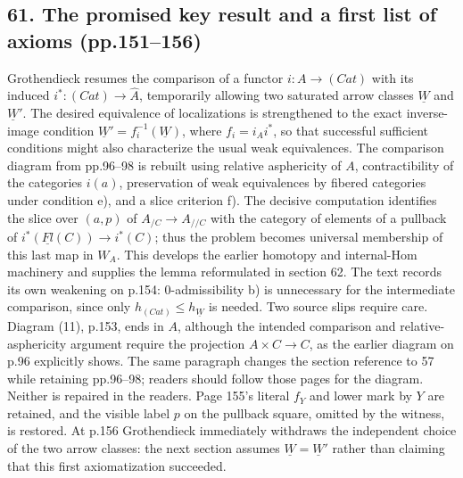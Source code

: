 \subsection*{61. The promised key result and a first list of axioms (pp.151--156)}
Grothendieck resumes the comparison of a functor $i:A\to(Cat)$ with its induced $i^*:(Cat)\to\widehat A$, temporarily allowing two saturated arrow classes $\underline W$ and $\underline W'$. The desired equivalence of localizations is strengthened to the exact inverse-image condition $\underline W'=f_i^{-1}(\underline W)$, where $f_i=i_Ai^*$, so that successful sufficient conditions might also characterize the usual weak equivalences. The comparison diagram from pp.96--98 is rebuilt using relative asphericity of $A$, contractibility of the categories $i(a)$, preservation of weak equivalences by fibered categories under condition e), and a slice criterion f). The decisive computation identifies the slice over $(a,p)$ of $A_{/C}\to A_{//C}$ with the category of elements of a pullback of $i^*(\underline{Fl}(C))\to i^*(C)$; thus the problem becomes universal membership of this last map in $W_A$. This develops the earlier homotopy and internal-Hom machinery and supplies the lemma reformulated in section 62. The text records its own weakening on p.154: 0-admissibility b) is unnecessary for the intermediate comparison, since only $h_{(Cat)}\leq h_{\underline W}$ is needed. Two source slips require care. Diagram (11), p.153, ends in $A$, although the intended comparison and relative-asphericity argument require the projection $A\times C\to C$, as the earlier diagram on p.96 explicitly shows. The same paragraph changes the section reference to 57 while retaining pp.96--98; readers should follow those pages for the diagram. Neither is repaired in the readers. Page 155's literal $f_Y$ and lower mark by $Y$ are retained, and the visible label $p$ on the pullback square, omitted by the witness, is restored. At p.156 Grothendieck immediately withdraws the independent choice of the two arrow classes: the next section assumes $\underline W=\underline W'$ rather than claiming that this first axiomatization succeeded.

